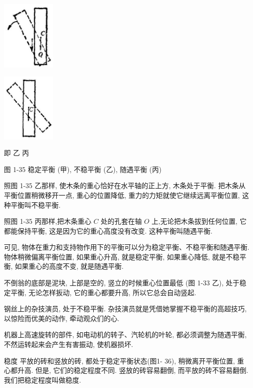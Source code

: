 \documentclass[10pt]{article}
\begin{document}
\begin{center}
\includegraphics[max width=0.2\textwidth]{images/01912d55-147c-70aa-b0e0-1782a122f948_46_155633.jpg}
\end{center}

\begin{center}
\includegraphics[max width=0.2\textwidth]{images/01912d55-147c-70aa-b0e0-1782a122f948_46_302446.jpg}
\end{center}

即 乙 丙

图 1-35 稳定平衡 (甲), 不稳平衡 (乙), 随遇平衡 (丙)

照图 1-35 乙那样, 使木条的重心恰好在水平轴的正上方, 木条处于平衡. 把木条从平衡位置稍微移开一点, 重心的位置降低, 重力的力矩就使它继续远离平衡位置, 这种平衡叫不稳平衡.

照图 1-35 丙那样,把木条重心 \(C\) 处的孔套在轴 \(O\) 上,无论把木条拔到任何位置, 它都能保持平衡, 这是因为它的重心高度没有改变. 这种平衡叫随遇平衡.

可见, 物体在重力和支持物作用下的平衡可以分为稳定平衡、不稳平衡和随遇平衡. 物体稍微偏离平衡位置, 如果重心升高, 就是稳定平衡, 如果重心降低, 就是不稳平衡, 如果重心的高度不变, 就是随遇平衡.

不倒翁的底部是泥块, 上部是空的, 竖立的时候重心位置最低 (图 1-33 乙), 处于稳定平衡, 无论怎样扳动, 它的重心都要升高, 所以它总会自动竖起.

钢丝上的杂技演员, 处于不稳平衡. 杂技演员就是凭借她掌握不稳平衡的高超技巧, 以惊险而优美的动作, 牵动观众们的心.

机器上高速旋转的部件, 如电动机的转子、汽轮机的叶轮, 都必须调整为随遇平衡, 不然运转起来会产生有害振动, 使机器损坏.

稳度 平放的砖和竖放的砖, 都处于稳定平衡状态(图1- 36), 稍微离开平衡位置, 重心都升高. 但是, 它们的稳定程度不同. 竖放的砖容易翻倒, 而平放的砖不容易翻倒. 我们把稳定程度叫做稳度.
\end{document}
